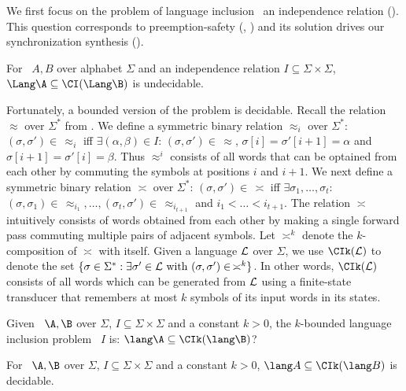 We first focus on the problem of language inclusion \upto~an independence relation ().  This question corresponds to preemption-safety (, ) and its solution drives our synchronization synthesis ().


\begin{theorem}\label{thm:langinc.undecidable}
For \nfas~$A, B$ over alphabet $\Sigma$ and an independence relation $I\subseteq \Sigma\times\Sigma$, $\Lang \A \subseteq \CI(\Lang \B)$ is undecidable\cite{bertoni1982equivalence}.  
\end{theorem} 

Fortunately, a bounded version of the problem is decidable. 
Recall the relation $\approx$ over $\Sigma^*$ from . 
We define a symmetric binary relation $\approx_i$ over $\Sigma^*$:
$(\sigma, \sigma') \in \, \approx_i$ iff $\exists (\alpha,\beta) \in I$: 
$(\sigma, \sigma') \in \, \approx$, $\sigma[i] = \sigma'[i+1] = \alpha$ and 
$\sigma[i+1] = \sigma'[i] = \beta$.
Thus $\approx^i$ consists of all words that can be optained from each other by commuting 
the symbols at positions $i$ and $i+1$.
We next define a symmetric binary relation $\asymp$ over $\Sigma^*$: 
$(\sigma,\sigma') \in \, \asymp$ iff $\exists \sigma_1,\ldots,\sigma_t$: 
$(\sigma,\sigma_1) \in \, \approx_{i_1},\ldots, (\sigma_{t},\sigma') \in \, \approx_{i_{t+1}}$ 
and $i_1 < \ldots < i_{t+1}$.
The relation $\asymp$ intuitively consists of words obtained from each other
by making a single forward pass commuting multiple pairs of adjacent symbols.
Let $\asymp^k$ denote the $k$-composition of $\asymp$ with itself. 
Given a language ${\cal L}$ over $\Sigma$, 
we use $\CIk({\cal L})$ to denote the set $\{\sigma \in \Sigma^*: \exists \sigma' \in \cal L \text{ with } (\sigma,\sigma') \in \, \asymp^{\mbox{$\scriptstyle k$}}  \}$.
In other words, $\CIk({\cal L})$ consists of all words which can be generated from 
${\cal L}$ using a finite-state transducer that remembers at most $k$ symbols 
of its input words in its states.  

\begin{definition}
Given \nfas~$\A, \B$ over $\Sigma$, $I\subseteq \Sigma\times\Sigma$ and a constant $k>0$, the $k$-bounded language inclusion problem \upto~$I$ is: $\lang \A \subseteq \CIk(\lang \B)$? 
\end{definition}

\begin{theorem}\label{thm:boundlanginc}
For \nfas~$\A, \B$ over $\Sigma$, $I\subseteq \Sigma\times\Sigma$ and a constant $k>0$,  
$\lang A \subseteq \CIk(\lang B)$ is decidable. 
\end{theorem}

